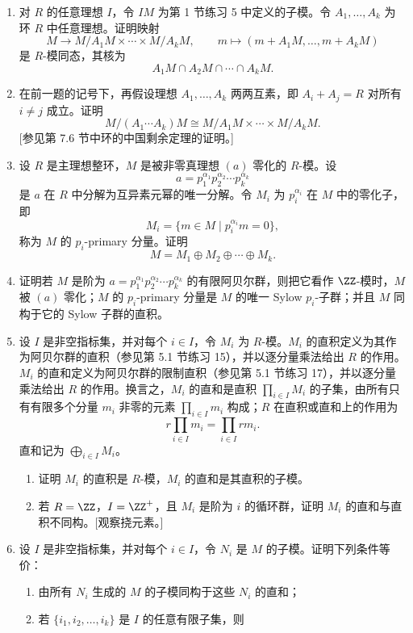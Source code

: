 \begin{enumerate}[label=\arabic*.]
	以下两题建立模的中国剩余定理（参见第 7.6 节）。
	\item 对 $R$ 的任意理想 $I$，令 $IM$ 为第 1 节练习 5 中定义的子模。令 $A_1,\ldots,A_k$ 为环 $R$ 中任意理想。证明映射
	\[
	M\longrightarrow M/A_1M\times\cdots\times M/A_kM,
	\qquad m\longmapsto(m+A_1M,\ldots,m+A_kM)
	\]
	是 $R$-模同态，其核为
	\[
	A_1M\cap A_2M\cap\cdots\cap A_kM.
	\]
	\item 在前一题的记号下，再假设理想 $A_1,\ldots,A_k$ 两两互素，即 $A_i+A_j=R$ 对所有 $i\neq j$ 成立。证明
	\[
	M/(A_1\cdots A_k)M\cong M/A_1M\times\cdots\times M/A_kM.
	\]
	[参见第 7.6 节中环的中国剩余定理的证明。]
	\item 设 $R$ 是主理想整环，$M$ 是被非零真理想 $(a)$ 零化的 $R$-模。设
	\[
	a=p_1^{\alpha_1}p_2^{\alpha_2}\cdots p_k^{\alpha_k}
	\]
	是 $a$ 在 $R$ 中分解为互异素元幂的唯一分解。令 $M_i$ 为 $p_i^{\alpha_i}$ 在 $M$ 中的零化子，即
	\[
	M_i=\{m\in M\mid p_i^{\alpha_i}m=0\},
	\]
	称为 $M$ 的 $p_i$-primary 分量。证明
	\[
	M=M_1\oplus M_2\oplus\cdots\oplus M_k.
	\]
	\item 证明若 $M$ 是阶为 $a=p_1^{\alpha_1}p_2^{\alpha_2}\cdots p_k^{\alpha_k}$ 的有限阿贝尔群，则把它看作 $\ZZ$-模时，$M$ 被 $(a)$ 零化；$M$ 的 $p_i$-primary 分量是 $M$ 的唯一 Sylow $p_i$-子群；并且 $M$ 同构于它的 Sylow 子群的直积。
	\item 设 $I$ 是非空指标集，并对每个 $i\in I$，令 $M_i$ 为 $R$-模。$M_i$ 的直积定义为其作为阿贝尔群的直积（参见第 5.1 节练习 15），并以逐分量乘法给出 $R$ 的作用。$M_i$ 的直和定义为阿贝尔群的限制直积（参见第 5.1 节练习 17），并以逐分量乘法给出 $R$ 的作用。换言之，$M_i$ 的直和是直积 $\prod_{i\in I}M_i$ 的子集，由所有只有有限多个分量 $m_i$ 非零的元素 $\prod_{i\in I}m_i$ 构成；$R$ 在直积或直和上的作用为
	\[
	r\prod_{i\in I}m_i=\prod_{i\in I}rm_i.
	\]
	直和记为 $\bigoplus_{i\in I}M_i$。
	\begin{enumerate}[label=(\alph*)]
		\item 证明 $M_i$ 的直积是 $R$-模，$M_i$ 的直和是其直积的子模。
		\item 若 $R=\ZZ$，$I=\ZZ^+$，且 $M_i$ 是阶为 $i$ 的循环群，证明 $M_i$ 的直和与直积不同构。[观察挠元素。]
	\end{enumerate}
	\item 设 $I$ 是非空指标集，并对每个 $i\in I$，令 $N_i$ 是 $M$ 的子模。证明下列条件等价：
	\begin{enumerate}[label=(\roman*)]
		\item 由所有 $N_i$ 生成的 $M$ 的子模同构于这些 $N_i$ 的直和；
		\item 若 $\{i_1,i_2,\ldots,i_k\}$ 是 $I$ 的任意有限子集，则

\end{enumerate}
\end{enumerate}
